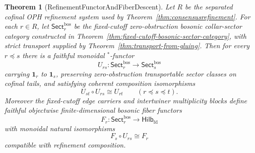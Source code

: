 \documentclass[11pt]{article}
\newtheorem{theorem}{Theorem}[section]
\begin{document}
\begin{theorem}[RefinementFunctorAndFiberDescent]\label{thm:refinement-functor-fiber-descent}
Let \(R\) be the separated cofinal OPH refinement system used by
Theorem~\ref{thm:consensusrefinement}. For each \(r\in R\), let
\(\mathsf{Sect}^{\mathrm{bos}}_r\) be the fixed-cutoff zero-obstruction bosonic collar-sector
category constructed in Theorem~\ref{thm:fixed-cutoff-bosonic-sector-category}, with strict
transport supplied by Theorem~\ref{thm:transport-from-gluing}. Then for every \(r\preceq s\)
there is a faithful monoidal \(^*\)-functor
\[
U_{rs}:\mathsf{Sect}^{\mathrm{bos}}_r\longrightarrow \mathsf{Sect}^{\mathrm{bos}}_s
\]
carrying \(\mathbf 1_r\) to \(\mathbf 1_s\), preserving zero-obstruction transportable sector
classes on cofinal tails, and satisfying coherent composition isomorphisms
\[
U_{st}\circ U_{rs}\cong U_{rt}
\qquad (r\preceq s\preceq t).
\]
Moreover the fixed-cutoff edge carriers and intertwiner multiplicity blocks define faithful
objectwise finite-dimensional bosonic fiber functors
\[
F_r:\mathsf{Sect}^{\mathrm{bos}}_r\longrightarrow \mathsf{Hilb}_{\mathrm{fd}}
\]
with monoidal natural isomorphisms
\[
F_s\circ U_{rs}\cong F_r
\]
compatible with refinement composition.
\end{theorem}
\end{document}
